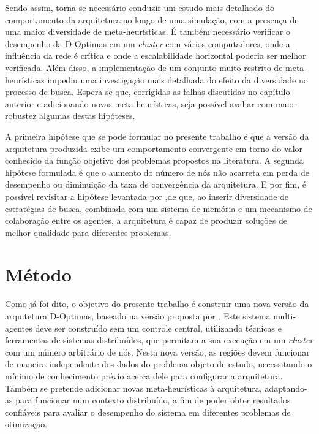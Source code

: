 Sendo assim, torna-se necessário conduzir um estudo mais  detalhado do comportamento da arquitetura ao longo de uma simulação, com a presença de uma maior diversidade de meta-heurísticas. É também necessário verificar o desempenho da D-Optimas em um \textit{cluster} com vários computadores, onde a influência da rede é crítica e onde a escalabilidade horizontal poderia ser melhor verificada. Além disso, a implementação de um conjunto muito restrito de meta-heurísticas impediu uma investigação mais detalhada do efeito da diversidade no processo de busca. Espera-se que, corrigidas as falhas discutidas no capítulo anterior e adicionando novas meta-heurísticas, seja possível avaliar com maior robustez algumas destas hipóteses. 

A primeira hipótese que se pode formular no presente trabalho é que a versão da arquitetura produzida exibe um comportamento convergente em torno do valor conhecido da função objetivo dos problemas propostos na literatura. A segunda hipótese formulada é que o aumento do número de nós não acarreta em perda de desempenho ou diminuição da taxa de convergência da arquitetura. E por fim, é possível revisitar a hipótese levantada por ,de que, ao inserir diversidade de estratégias
de busca, combinada com um sistema de memória e um mecanismo de colaboração entre
os agentes, a arquitetura é capaz de produzir soluções de melhor qualidade para diferentes problemas.


\section{Método}
\label{sec:metodo}

Como já foi dito, o objetivo do presente trabalho é construir uma nova versão da arquitetura  D-Optimas, baseado na versão proposta por . Este sistema multi-agentes deve ser construído sem um controle central, utilizando técnicas e ferramentas de sistemas distribuídos, que permitam a sua execução em um \textit{cluster} com um número arbitrário de nós. Nesta nova versão, as regiões devem funcionar de maneira independente dos dados do problema objeto de estudo, necessitando o mínimo de conhecimento prévio acerca dele para configurar a arquitetura. Também se pretende adicionar novas meta-heurísticas à arquitetura, adaptando-as para funcionar num contexto distribuído, a fim de poder obter resultados confiáveis para avaliar o desempenho do sistema em diferentes problemas de otimização. 

